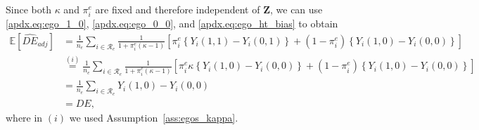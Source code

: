 \documentclass[11pt]{article}
\theoremstyle{definition}
\def \bZ {\boldsymbol{Z}}
\def \cR {\mathcal{R}}
\def \EX {\mathbb{E}}
\begin{document}
Since both $\kappa$ and $\pi_i^e$ are fixed and therefore independent of $\bZ$, we can use \eqref{apdx.eq:ego_1_0}, \eqref{apdx.eq:ego_0_0}, and \eqref{apdx.eq:ego_ht_bias} to obtain
\begin{equation*}
    \begin{aligned}
        \EX \left[\widehat{DE}_{adj} \right]
        &=
        \frac{1}{n_e}
    \sum_{i \in \cR_e}
    \frac{1}{1 + \pi_i^e(\kappa-1)}
    \left[
    \pi_i^e\left\{Y_i(1,1) - Y_i(0,1)
    \right\}
    +
    (1-\pi_i^e)\left\{Y_i(1,0) - Y_i(0,0)
    \right\}
    \right]
    \\ &\overset{(i)}{=}
      \frac{1}{n_e}
    \sum_{i \in \cR_e}
    \frac{1}{1 + \pi_i^e(\kappa-1)}
    \left[
    \pi_i^e\kappa\left\{Y_i(1,0) - Y_i(0,0)
    \right\}
    +
    (1-\pi_i^e)\left\{Y_i(1,0) - Y_i(0,0)
    \right\}
    \right]
    \\ &=
    \frac{1}{n_e}
    \sum_{i \in \cR_e}
    Y_i(1,0) - Y_i(0,0)
    \\ &=
    DE,
    \end{aligned}
\end{equation*}
where in $(i)$ we used Assumption~\ref{ass:egos_kappa}.
\end{document}
